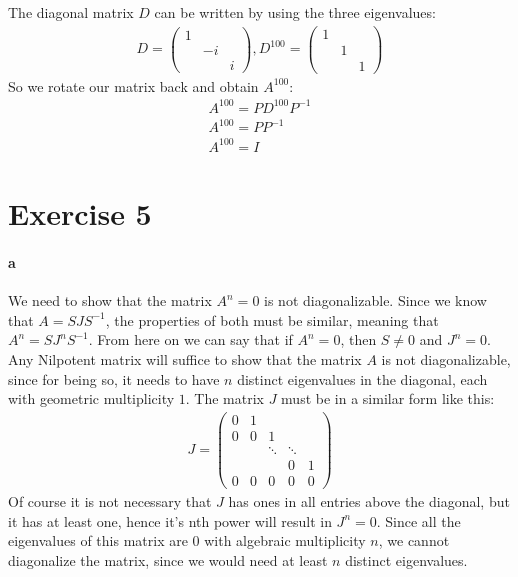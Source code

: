 The diagonal matrix $D$ can be written by using the three eigenvalues:
\begin{gather*}
D = \left( \begin{array}{ccc}
1 & &\\
& -i & \\
&& i
\end{array}\right), D^{100} = 
\left( \begin{array}{ccc}
1 & &\\
& 1 & \\
&& 1
\end{array} \right) 
\end{gather*}
So we rotate our matrix back and obtain $A^100$:
\begin{gather*}
A^{100} = P D^{100} P^{-1} \\
A^{100} = PP^{-1}\\
A^{100} = I
\end{gather*}

\section{Exercise 5}
\paragraph{a}
We need to show that the matrix $A^n = 0$ is not diagonalizable.
Since we know that $A = SJS^{-1}$, the properties of both must be similar, meaning that $A^n = SJ^nS^{-1}$. From here on we can say that if $A^n=0$, then $S \neq 0$ and $J^n = 0$.
Any Nilpotent matrix will suffice to show that the matrix $A$ is not diagonalizable, since for being so, it needs to have $n$ distinct eigenvalues in the diagonal, each with geometric multiplicity $1$.
The matrix $J$ must be in a similar form like this:
\begin{gather*}
J = \left( \begin{array}{ccccc}
0 & 1 & & &\\
0 & 0 & 1 &\\
 &  & \ddots &\ddots\\
& & & 0 & 1\\ 
0 & 0 & 0 & 0 & 0
\end{array}\right)
\end{gather*}
Of course it is not necessary that $J$ has ones in all entries above the diagonal, but it has at least one, hence it's nth power will result in $J^n=0$.
Since all the eigenvalues of this matrix are $0$ with algebraic multiplicity $n$, we cannot diagonalize the matrix, since we would need at least $n$ distinct eigenvalues.

